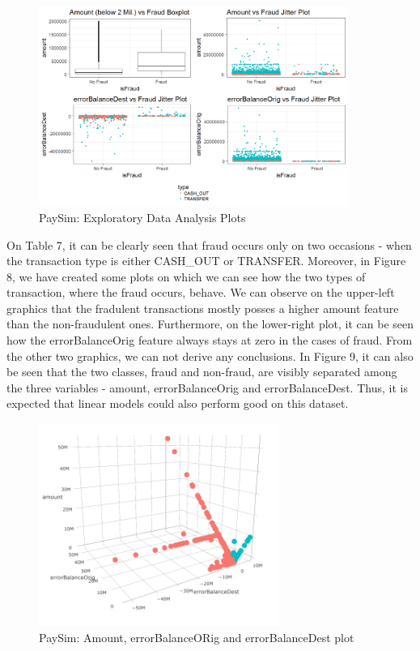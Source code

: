 \documentclass[12pt,]{article}
\begin{document}
\begin{figure}
\centering
\includegraphics[width=0.9\textwidth,height=\textheight]{figures/paySim/descriptive/four_plots.png}
\caption{PaySim: Exploratory Data Analysis Plots}
\end{figure}

On Table 7, it can be clearly seen that fraud occurs only on two
occasions - when the transaction type is either CASH\_OUT or TRANSFER.
Moreover, in Figure 8, we have created some plots on which we can see
how the two types of transaction, where the fraud occurs, behave. We can
observe on the upper-left graphics that the fradulent transactions
mostly posses a higher amount feature than the non-fraudulent ones.
Furthermore, on the lower-right plot, it can be seen how the
errorBalanceOrig feature always stays at zero in the cases of fraud.
From the other two graphics, we can not derive any conclusions. In
Figure 9, it can also be seen that the two classes, fraud and non-fraud,
are visibly separated among the three variables - amount,
errorBalanceOrig and errorBalanceDest. Thus, it is expected that linear
models could also perform good on this dataset.

\begin{figure}
\centering
\includegraphics[width=0.7\textwidth,height=\textheight]{figures/paySim/descriptive/threedimensionalplot.png}
\caption{PaySim: Amount, errorBalanceORig and errorBalanceDest plot}
\end{figure}
\end{document}
